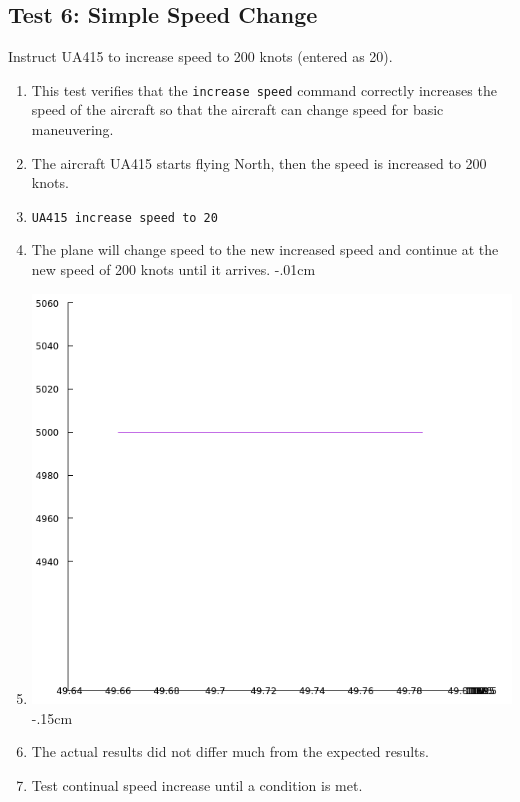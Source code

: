 \documentclass[letterpaper, 12pt]{article}
\begin{document}
\subsection{Test 6: Simple Speed Change}
Instruct UA415 to increase speed to 200 knots (entered as 20).
\begin{enumerate}\itemsep-.15cm
\item This test verifies that the \verb!increase speed! command correctly increases the speed of the aircraft so that the aircraft can change speed for basic maneuvering.
\item The aircraft UA415 starts flying North, then the speed is increased to 200 knots.
\item \verb!UA415 increase speed to 20!
\item The plane will change speed to the new increased speed and continue at the new speed of 200 knots until it arrives.
\itemsep-.01cm
\item \includegraphics[scale=.45,valign=t,center]{test6.png}
\itemsep-.15cm
\item The actual results did not differ much from the expected results.
\item Test continual speed increase until a condition is met.
\end{enumerate}
\end{document}

